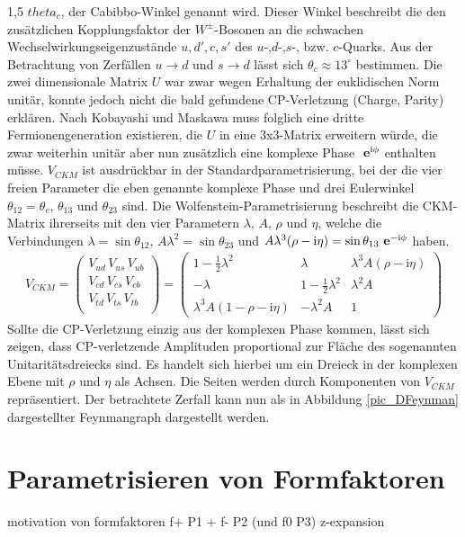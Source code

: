 \documentclass[11pt,a4paper,twoside]{report}
\begin{document}
\begin{spacing}{1,5}
$theta_c$, der Cabibbo-Winkel genannt wird. Dieser Winkel beschreibt die den zusätzlichen Kopplungsfaktor der $W^\pm$-Bosonen an die schwachen 
Wechselwirkungseigenzustände $u, d', c, s'$ des $u$-,$d$-,$s$-, bzw. $c$-Quarks. Aus der Betrachtung von Zerfällen $u\rightarrow d$ und $s\rightarrow d$ lässt
sich $\theta_c \approx 13^\circ$ bestimmen. Die zwei dimensionale Matrix $U$ war zwar wegen Erhaltung der euklidischen Norm unitär, konnte jedoch nicht die 
bald gefundene CP-Verletzung (Charge, Parity) erklären. Nach Kobayashi und Maskawa muss folglich eine dritte Fermionengeneration existieren,
die $U$ in eine 3x3-Matrix erweitern würde, die zwar weiterhin unitär aber nun zusätzlich eine komplexe Phase $\ \mathbf{e}^{\text{i}\phi}$ enthalten müsse. $V_{CKM}$ ist
ausdrückbar in der Standardparametrisierung, bei der die vier freien Parameter die eben genannte komplexe Phase und drei Eulerwinkel 
$\theta_{12} = \theta_c,\, \theta_{13}$ und $\theta_{23}$ sind. Die Wolfenstein-Parametrisierung beschreibt die CKM-Matrix ihrerseits mit den vier Parametern
$\lambda,\, A,\, \rho$ und $\eta$, welche die Verbindungen $\lambda = \sin\theta_{12},\, A\lambda^2 = \sin\theta_{23}$ und $A\lambda^3(\rho-\text{i}\eta) = \sin\theta_{13}\ \mathbf{e}^{-\text{i}\phi}$
haben.
\begin{align}
 V_{CKM} = \begin{pmatrix}
            V_{ud}\,V_{us}\,V_{ub}\\
            V_{cd}\,V_{cs}\,V_{cb}\\
            V_{td}\,V_{ts}\,V_{tb}\\
           \end{pmatrix} = \begin{pmatrix}
			    1-\frac12\lambda^2 & \lambda & \lambda^3A(\rho-\text{i}\eta)\\
			    -\lambda & 1-\frac12 \lambda^2 &\lambda^2A\\
			    \lambda^3A(1-\rho-\text{i}\eta) &-\lambda^2A & 1
			    \end{pmatrix}
\end{align}
Sollte die CP-Verletzung einzig aus der komplexen Phase kommen, lässt sich zeigen, dass CP-verletzende Amplituden proportional zur Fläche des sogenannten
Unitaritätsdreiecks sind. Es handelt sich hierbei um ein Dreieck in der komplexen Ebene mit $\rho$ und $\eta$ als Achsen. Die Seiten werden durch Komponenten
von $V_{CKM}$ repräsentiert. Der betrachtete Zerfall kann nun als in Abbildung \ref{pic_DFeynman} dargestellter Feynmangraph dargestellt werden.

\section{Parametrisieren von Formfaktoren}
motivation von formfaktoren
f+ P1 + f- P2 (und f0 P3)
z-expansion


\end{spacing}
\end{document}

